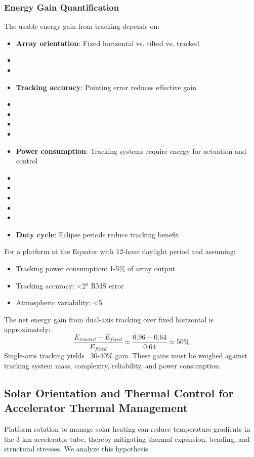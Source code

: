 {{{{\subsubsection{Energy Gain Quantification}
The usable energy gain from tracking depends on:
\begin{itemize}
    \item \textbf{Array orientation}: Fixed horizontal vs. tilted vs. tracked
    \item \item \item \textbf{Tracking accuracy}: Pointing error reduces effective gain
    \item \item \item \item \item \textbf{Power consumption}: Tracking systems require energy for actuation and control
    \item \item \item \item \item \item \textbf{Duty cycle}: Eclipse periods reduce tracking benefit
\end{itemize}
For a platform at the Equator with 12-hour daylight period and assuming:
\begin{itemize}
    \item Tracking power consumption: 1-5\% of array output
    \item Tracking accuracy: <2° RMS error
    \item Atmospheric variability: <5%
\end{itemize}
The net energy gain from dual-axis tracking over fixed horizontal is approximately:
\begin{equation}
\frac{E_{tracked} - E_{fixed}}{E_{fixed}} \approx \frac{0.96 - 0.64}{0.64} \approx 50\%
\end{equation}
Single-axis tracking yields ~30-40\% gain. These gains must be weighed against tracking system mass, complexity, reliability, and power consumption.

\subsection{Solar Orientation and Thermal Control for Accelerator Thermal Management}
Platform rotation to manage solar heating can reduce temperature gradients in the 3 km accelerator tube, thereby mitigating thermal expansion, bending, and structural stresses. We analyze this hypothesis.

}}}}
